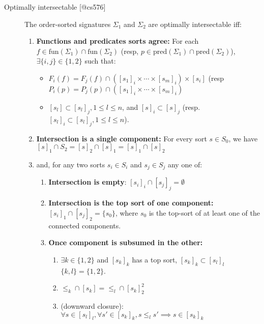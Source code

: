 \documentclass[]{article}
\providecommand{\tightlist}{%
  \setlength{\itemsep}{0pt}\setlength{\parskip}{0pt}}
\newcommand \intersect  {\cap }
\newcommand \fun             {\text{fun}}
\newcommand \pred            {\text{pred}}
\newcommand \SharedSorts     {S_0}
\newcommand \onetwo {\{1, 2\}}
\begin{document}
\begin{description}
\item[Optimally intersectable {[}@cs576{]}]
The order-sorted signatures \(\Sigma_1\) and \(\Sigma_2\) are optimally
intersectable iff:

\begin{enumerate}
\def\labelenumi{\arabic{enumi}.}
\item
  \textbf{Functions and predicates sorts agree:} For each
  \(f \in \fun(\Sigma_1) \intersect \fun(\Sigma_2)\) (resp,
  \(p \in \pred(\Sigma_1) \intersect \pred(\Sigma_2)\)),
  \(\exists \{i, j\} \in \onetwo\) such that:

  \begin{itemize}
  \item
    \(F_i(f) = F_j(f) \intersect ([s_1]_i\times\cdots\times [s_m]_i) \times [s_i]\)
    (resp
    \(P_i(p) = P_j(p) \intersect ([s_1]_i\times\cdots\times [s_m]_i)\)
  \item
    \([s_l] \subset [s_l]_j, 1 \le l \le n\), and
    \([s]_i \subset [s]_j\) (resp.
    \([s_l]_i \subset [s_l]_j, 1 \le l \le n\)).
  \end{itemize}
\item
  \textbf{Intersection is a single component:} For every sort
  \(s \in \SharedSorts\), we have
  \([s]_1 \intersect S_2 = [s]_2 \intersect [s]_1 = [s]_1\intersect [s]_2\)
\item
  and, for any two sorts \(s_i \in S_i\) and \(s_j \in S_j\) any one of:

  \begin{enumerate}
  \def\labelenumii{\roman{enumii}.}
  \item
    \textbf{Intersection is empty}:
    \([s_i]_i \intersect [s_j]_j = \emptyset\)
  \item
    \textbf{Intersection is the top sort of one component:}
    \([s_i]_1 \intersect [s_j]_2 = \{s_0\}\), where \(s_0\) is the
    top-sort of at least one of the connected components.
  \item
    \textbf{Once component is subsumed in the other:}

    \begin{enumerate}
    \def\labelenumiii{\alph{enumiii}.}
    \tightlist
    \item
      \(\exists k \in \onetwo\) and \([s_k]_k\) has a top sort,
      \([s_k]_k \subset [s_l]_l\) \(\{k, l\} = \onetwo\).
    \item
      \(\le_k \intersect [s_k] = \le_l \intersect [s_k]_2^2\)
    \item
      (downward closure):
      \(\forall s \in [s_l]_l, \forall s' \in [s_k]_k, s\le_l s' \implies s\in [s_k]_k\)
    \end{enumerate}
  \end{enumerate}
\end{enumerate}
\end{description}
\end{document}
